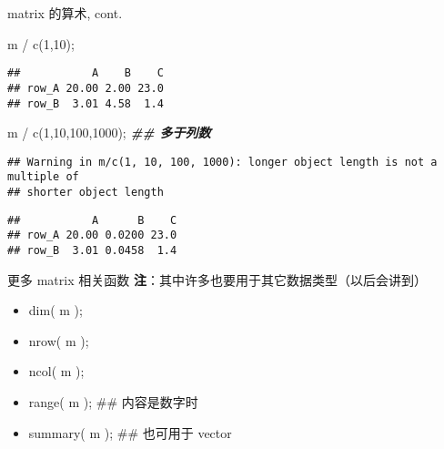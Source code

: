 \documentclass[ignorenonframetext,]{beamer}
\newenvironment{Shaded}{\begin{snugshade}}{\end{snugshade}}
\newcommand{\DecValTok}[1]{\textcolor[rgb]{0.00,0.00,0.81}{#1}}
\newcommand{\DocumentationTok}[1]{\textcolor[rgb]{0.56,0.35,0.01}{\textbf{\textit{#1}}}}
\newcommand{\FunctionTok}[1]{\textcolor[rgb]{0.00,0.00,0.00}{#1}}
\newcommand{\NormalTok}[1]{#1}
\newcommand{\SpecialCharTok}[1]{\textcolor[rgb]{0.00,0.00,0.00}{#1}}
\providecommand{\tightlist}{%
  \setlength{\itemsep}{0pt}\setlength{\parskip}{0pt}}
\newcommand\FontSmall{\fontsize{7}{8}\selectfont}
\begin{document}
\begin{frame}[fragile]{matrix 的算术, cont.}
\protect\hypertarget{matrix-ux7684ux7b97ux672f-cont.}{}
\FontSmall

\begin{Shaded}
\begin{Highlighting}[]
\NormalTok{m }\SpecialCharTok{/} \FunctionTok{c}\NormalTok{(}\DecValTok{1}\NormalTok{,}\DecValTok{10}\NormalTok{);}
\end{Highlighting}
\end{Shaded}

\begin{verbatim}
##           A    B    C
## row_A 20.00 2.00 23.0
## row_B  3.01 4.58  1.4
\end{verbatim}

\begin{Shaded}
\begin{Highlighting}[]
\NormalTok{m }\SpecialCharTok{/} \FunctionTok{c}\NormalTok{(}\DecValTok{1}\NormalTok{,}\DecValTok{10}\NormalTok{,}\DecValTok{100}\NormalTok{,}\DecValTok{1000}\NormalTok{); }\DocumentationTok{\#\# 多于列数}
\end{Highlighting}
\end{Shaded}

\begin{verbatim}
## Warning in m/c(1, 10, 100, 1000): longer object length is not a multiple of
## shorter object length
\end{verbatim}

\begin{verbatim}
##           A      B    C
## row_A 20.00 0.0200 23.0
## row_B  3.01 0.0458  1.4
\end{verbatim}
\end{frame}

\begin{frame}{更多 matrix 相关函数}
\protect\hypertarget{ux66f4ux591a-matrix-ux76f8ux5173ux51fdux6570}{}
\textbf{注}：其中许多也要用于其它数据类型（以后会讲到）

\begin{itemize}
\tightlist
\item
  dim( m );
\item
  nrow( m );
\item
  ncol( m );
\item
  range( m ); \#\# 内容是数字时
\item
  summary( m ); \#\# 也可用于 vector
\end{itemize}
\end{frame}
\end{document}
